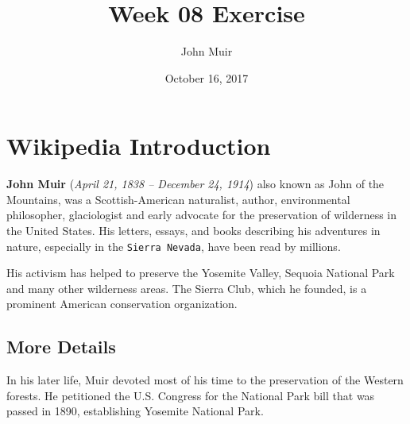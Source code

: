 \documentclass{article}
\title{Week 08 Exercise}
\author{John Muir}
\date{October 16, 2017}
\begin{document}
\maketitle

\section{Wikipedia Introduction}

\textbf{John Muir} (\textit{April 21, 1838 – December 24, 1914}) also known as John of the Mountains, was a \textsf{Scottish-American} naturalist, author, environmental philosopher, glaciologist and early advocate for the preservation of wilderness in the United States. His letters, essays, and books describing his adventures in nature, especially in the \texttt{Sierra Nevada}, have been read by millions. 

\par His activism has helped to preserve the Yosemite Valley, Sequoia National Park and many other wilderness areas. The Sierra Club, which he founded, is a prominent American conservation organization.

\subsection{More Details}
In his later life, Muir devoted most of his time to the preservation of the Western forests. He petitioned the U.S. Congress for the National Park bill that was passed in 1890, establishing Yosemite National Park.
\end{document}
